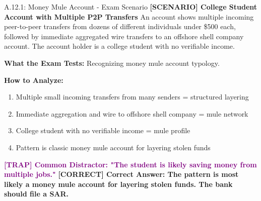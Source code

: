 \documentclass[11pt,a4paper]{beamer}
\newcommand{\trap}[1]{\textcolor{purple}{\textbf{[TRAP] #1}}}
\newcommand{\correct}[1]{\textcolor{green!50!black}{\textbf{[CORRECT] #1}}}
\newcommand{\scenario}[1]{\textcolor{blue!70!black}{\textbf{[SCENARIO] #1}}}
\begin{document}
	\begin{frame}{A.12.1: Money Mule Account - Exam Scenario}
		\scenario{College Student Account with Multiple P2P Transfers}
		An account shows multiple incoming peer-to-peer transfers from dozens of different individuals under \$500 each, followed by immediate aggregated wire transfers to an offshore shell company account. The account holder is a college student with no verifiable income.
		
		\vspace{0.1cm}
		\textbf{What the Exam Tests:} Recognizing money mule account typology.
		
		\vspace{0.1cm}
		\textbf{How to Analyze:}
		\begin{enumerate}
			\item Multiple small incoming transfers from many senders = structured layering
			\item Immediate aggregation and wire to offshore shell company = mule network
			\item College student with no verifiable income = mule profile
			\item Pattern is classic money mule account for layering stolen funds
		\end{enumerate}
		
		\trap{Common Distractor: "The student is likely saving money from multiple jobs."}
		\correct{Correct Answer: The pattern is most likely a money mule account for layering stolen funds. The bank should file a SAR.}
	\end{frame}
	
	
\end{document}

